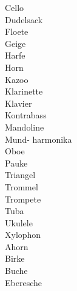 \documentclass{article}
\begin{document}
Cello
\newpage
\phantom{ }\\

Dudelsack
\newpage
\phantom{ }\\

Floete
\newpage
\phantom{ }\\

Geige
\newpage
\phantom{ }\\

Harfe
\newpage
\phantom{ }\\

Horn
\newpage
\phantom{ }\\

Kazoo
\newpage
\phantom{ }\\

Klarinette
\newpage
\phantom{ }\\

Klavier
\newpage
\phantom{ }\\

Kontrabass
\newpage
\phantom{ }\\

Mandoline
\newpage
\phantom{ }\\

Mund-
harmonika
\newpage
\phantom{ }\\

Oboe
\newpage
\phantom{ }\\

Pauke
\newpage
\phantom{ }\\

Triangel
\newpage
\phantom{ }\\

Trommel
\newpage
\phantom{ }\\

Trompete
\newpage
\phantom{ }\\

Tuba
\newpage
\phantom{ }\\

Ukulele
\newpage
\phantom{ }\\

Xylophon
\newpage
\phantom{ }\\

Ahorn
\newpage
\phantom{ }\\

Birke
\newpage
\phantom{ }\\

Buche
\newpage
\phantom{ }\\

Eberesche
\newpage
\phantom{ }\\
\end{document}
